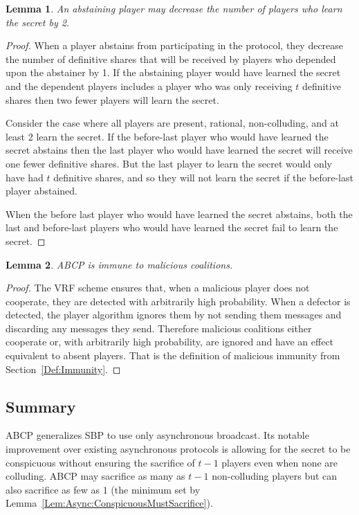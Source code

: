 \documentclass[12pt]{dalcsthesis}
\newtheorem{lemma}{Lemma}
\begin{document}
\begin{lemma}\label{Lem:ABCP:AbstainBad}An abstaining player may decrease the number of players who learn the secret by 2.\end{lemma}
\begin{proof}
When a player abstains from participating in the protocol, they decrease the number of definitive shares that will be received by players who depended upon the abstainer by 1. If the abstaining player would have learned the secret and the dependent players includes a player who was only receiving $t$ definitive shares then two fewer players will learn the secret.

Consider the case where all players are present, rational, non-colluding, and at least 2 learn the secret. If the before-last player who would have learned the secret abstains then the last player who would have learned the secret will receive one fewer definitive shares. But the last player to learn the secret would only have had $t$ definitive shares, and so they will not learn the secret if the before-last player abstained.

When the before last player who would have learned the secret abstains, both the last and before-last players who would have learned the secret fail to learn the secret.
\end{proof}

\begin{lemma}\label{Lem:ABCP:MalImmune}ABCP is immune to malicious coalitions.\end{lemma}
\begin{proof}
The VRF scheme ensures that, when a malicious player does not cooperate, they are detected with arbitrarily high probability. When a defector is detected, the player algorithm ignores them by not sending them messages and discarding any messages they send. Therefore malicious coalitions either cooperate or, with arbitrarily high probability, are ignored and have an effect equivalent to absent players. That is the definition of malicious immunity from Section~\ref{Def:Immunity}.
\end{proof}

\subsection{Summary}

ABCP generalizes SBP to use only asynchronous broadcast. Its notable improvement over existing asynchronous protocols is allowing for the secret to be conspicuous without ensuring the sacrifice of $t-1$ players even when none are colluding. ABCP may sacrifice as many as $t-1$ non-colluding players but can also sacrifice as few as $1$ (the minimum set by Lemma~\ref{Lem:Async:ConspicuousMustSacrifice}).
\end{document}
